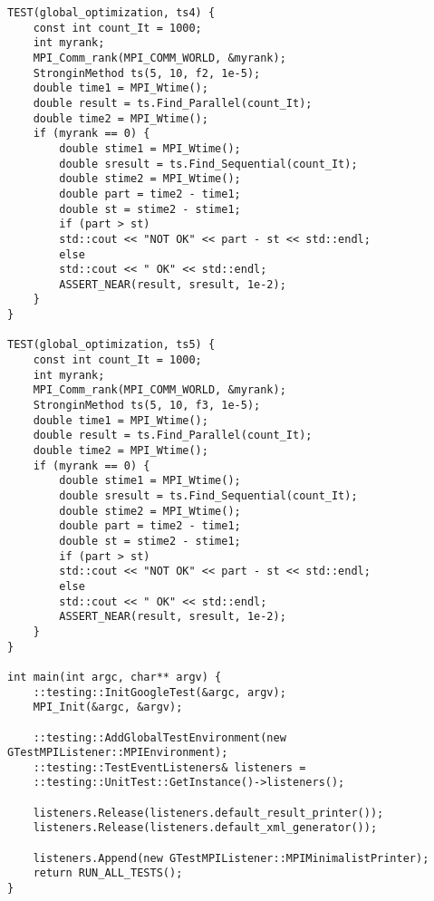 \documentclass{report}
\begin{document}
\begin{lstlisting}
TEST(global_optimization, ts4) {
	const int count_It = 1000;
	int myrank;
	MPI_Comm_rank(MPI_COMM_WORLD, &myrank);
	StronginMethod ts(5, 10, f2, 1e-5);
	double time1 = MPI_Wtime();
	double result = ts.Find_Parallel(count_It);
	double time2 = MPI_Wtime();
	if (myrank == 0) {
		double stime1 = MPI_Wtime();
		double sresult = ts.Find_Sequential(count_It);
		double stime2 = MPI_Wtime();
		double part = time2 - time1;
		double st = stime2 - stime1;
		if (part > st)
		std::cout << "NOT OK" << part - st << std::endl;
		else
		std::cout << " OK" << std::endl;
		ASSERT_NEAR(result, sresult, 1e-2);
	}
}

TEST(global_optimization, ts5) {
	const int count_It = 1000;
	int myrank;
	MPI_Comm_rank(MPI_COMM_WORLD, &myrank);
	StronginMethod ts(5, 10, f3, 1e-5);
	double time1 = MPI_Wtime();
	double result = ts.Find_Parallel(count_It);
	double time2 = MPI_Wtime();
	if (myrank == 0) {
		double stime1 = MPI_Wtime();
		double sresult = ts.Find_Sequential(count_It);
		double stime2 = MPI_Wtime();
		double part = time2 - time1;
		double st = stime2 - stime1;
		if (part > st)
		std::cout << "NOT OK" << part - st << std::endl;
		else
		std::cout << " OK" << std::endl;
		ASSERT_NEAR(result, sresult, 1e-2);
	}
}

int main(int argc, char** argv) {
	::testing::InitGoogleTest(&argc, argv);
	MPI_Init(&argc, &argv);
	
	::testing::AddGlobalTestEnvironment(new GTestMPIListener::MPIEnvironment);
	::testing::TestEventListeners& listeners =
	::testing::UnitTest::GetInstance()->listeners();
	
	listeners.Release(listeners.default_result_printer());
	listeners.Release(listeners.default_xml_generator());
	
	listeners.Append(new GTestMPIListener::MPIMinimalistPrinter);
	return RUN_ALL_TESTS();
}

\end{lstlisting}
\end{document}
